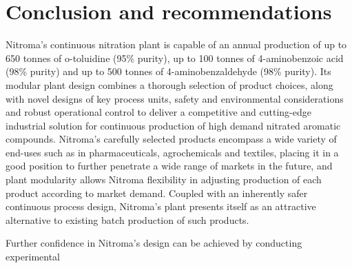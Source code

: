 \section*{Conclusion and recommendations}
Nitroma's continuous nitration plant is capable of an annual production of up to 650 tonnes of o-toluidine (95\% purity), up to 100 tonnes of 4-aminobenzoic acid (98\% purity) and up to 500 tonnes of 4-aminobenzaldehyde (98\% purity). Its modular plant design combines a thorough selection of product choices, along with novel designs of key process units, safety and environmental considerations and robust operational control to deliver a competitive and cutting-edge industrial solution for continuous production of high demand nitrated aromatic compounds. Nitroma's carefully selected products encompass a wide variety of end-uses such as in pharmaceuticals, agrochemicals and textiles, placing it in a good position to further penetrate a wide range of markets in the future, and plant modularity allows Nitroma flexibility in adjusting production of each product according to market demand. Coupled with an inherently safer continuous process design, Nitroma's plant presents itself as an attractive alternative to existing batch production of such products.

Further confidence in Nitroma's design can be achieved by conducting experimental 

